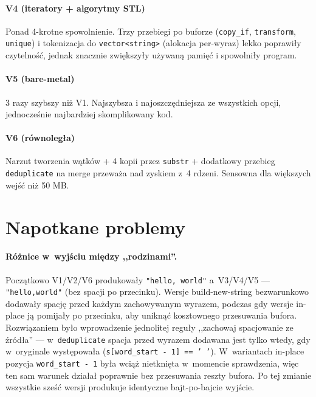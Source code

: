 \documentclass[11pt,a4paper]{article}
\begin{document}
\paragraph{V4 (iteratory + algorytmy STL)} Ponad 4-krotne spowolnienie. Trzy przebiegi po buforze (\texttt{copy\_if}, \texttt{transform}, \texttt{unique}) i tokenizacja do \texttt{vector<string>} (alokacja per-wyraz) lekko poprawiły czytelność, jednak znacznie zwiększyły używaną pamięć i spowolniły program.

\paragraph{V5 (bare-metal)} 3 razy szybszy niż V1. Najszybsza i najoszczędniejsza ze wszystkich opcji, jednocześnie najbardziej skomplikowany kod.

\paragraph{V6 (równoległa)} Narzut tworzenia wątków + 4 kopii przez \texttt{substr} + dodatkowy przebieg \texttt{deduplicate} na merge przeważa nad zyskiem z~4 rdzeni. Sensowna dla większych wejść niż 50 MB.

\section{Napotkane problemy}

\paragraph{Różnice w~wyjściu między ,,rodzinami''.} Początkowo V1/V2/V6 produkowały \texttt{"hello, world"} a~V3/V4/V5 --- \texttt{"hello,world"} (bez spacji po przecinku). Wersje build-new-string bezwarunkowo dodawały spację przed każdym zachowywanym wyrazem, podczas gdy wersje in-place ją pomijały po przecinku, aby uniknąć kosztownego przesuwania bufora. Rozwiązaniem było wprowadzenie jednolitej reguły ,,zachowaj spacjowanie ze źródła'' --- w~\texttt{deduplicate} spacja przed wyrazem dodawana jest tylko wtedy, gdy w~oryginale występowała (\texttt{s[word\_start - 1] == ' '}). W~wariantach in-place pozycja \texttt{word\_start - 1} była wciąż nietknięta w~momencie sprawdzenia, więc ten sam warunek działał poprawnie bez przesuwania reszty bufora. Po tej zmianie wszystkie sześć wersji produkuje identyczne bajt-po-bajcie wyjście.
\end{document}
